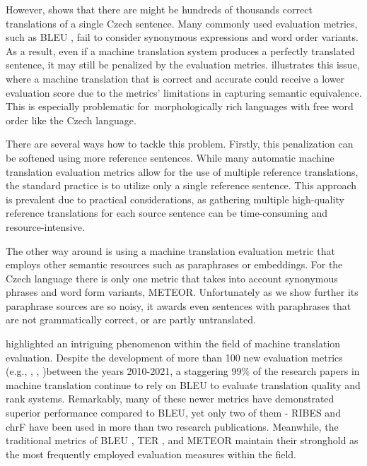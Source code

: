 However, \citep{bojar-scratching} shows that there are might be hundreds of thousands correct translations of a single Czech sentence. Many commonly used evaluation metrics, such as BLEU \citep{bleu}, fail to consider synonymous expressions and word order variants. As a result, even if a machine translation system produces a perfectly translated sentence, it may still be penalized by the evaluation metrics.  illustrates this issue, where a machine translation that is correct and accurate could receive a lower evaluation score due to the metrics' limitations in capturing semantic equivalence. This is especially problematic for~morphologically rich languages with free word order like the Czech language. \cite{bojar-tackling-sparse-data}

There are several ways how to tackle this problem. Firstly, this penalization can be softened using more reference sentences. While many automatic machine translation evaluation metrics allow for the use of multiple reference translations, the standard practice is to utilize only a single reference sentence. This approach is prevalent due to practical considerations, as gathering multiple high-quality reference translations for each source sentence can be time-consuming and resource-intensive. 

The other way around is using a machine translation evaluation metric that employs other semantic resources such as paraphrases or embeddings. For the Czech language there is only one metric that takes into account synonymous phrases and word form variants, METEOR. \cite{meteor-wmt:2014}  Unfortunately as we show further its paraphrase sources are so noisy, it awards even sentences with paraphrases that are not grammatically correct, or are partly untranslated.


\cite{marie-etal-2021-scientific} highlighted an intriguing phenomenon within the field of machine translation evaluation. Despite the development of more than 100 new evaluation metrics (e.g., \cite{rei-etal-2020-comet}, \cite{BERTScore}, \cite{kocmi-federmann-2023-large} )between the years 2010-2021, a staggering 99\% of the research papers in machine translation continue to rely on BLEU to evaluate translation quality and rank systems. Remarkably, many of these newer metrics have demonstrated superior performance compared to BLEU, yet only two of them - RIBES \citep{ribes:isozaki-etal-2010-automatic} and chrF \citep{popovic-2015-chrf} have been used in more than two research publications. Meanwhile, the traditional metrics of BLEU \citep{bleu}, TER \citep{ter}, and METEOR \citep{meteor-wmt:2014} maintain their stronghold as the most frequently employed evaluation measures within the field. 

